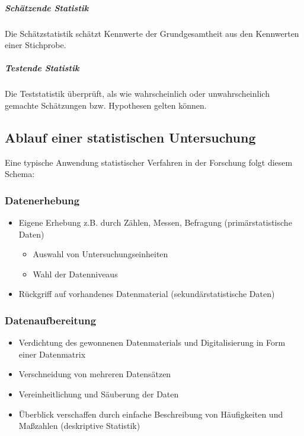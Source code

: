 \documentclass[
  11pt,
  ngerman,
  a4paper,
]{report}
\providecommand{\tightlist}{%
  \setlength{\itemsep}{0pt}\setlength{\parskip}{0pt}}
\begin{document}
\hypertarget{schuxe4tzende-statistik}{%
\subparagraph{Schätzende Statistik}\label{schuxe4tzende-statistik}}

Die Schätzstatistik schätzt Kennwerte der Grundgesamtheit aus den Kennwerten einer Stichprobe.

\hypertarget{testende-statistik}{%
\subparagraph{Testende Statistik}\label{testende-statistik}}

Die Teststatistik überprüft, als wie wahrscheinlich oder unwahrscheinlich gemachte Schätzungen bzw. Hypothesen gelten können.

\hypertarget{ablauf-einer-statistischen-untersuchung}{%
\subsection{Ablauf einer statistischen Untersuchung}\label{ablauf-einer-statistischen-untersuchung}}

Eine typische Anwendung statistischer Verfahren in der Forschung folgt diesem Schema:

\hypertarget{datenerhebung}{%
\subsubsection{Datenerhebung}\label{datenerhebung}}

\begin{itemize}
\tightlist
\item
  Eigene Erhebung z.B. durch Zählen, Messen, Befragung (primärstatistische Daten)

  \begin{itemize}
  \tightlist
  \item
    Auswahl von Untersuchungseinheiten
  \item
    Wahl der Datenniveaus
  \end{itemize}
\item
  Rückgriff auf vorhandenes Datenmaterial (sekundärstatistische Daten)
\end{itemize}

\hypertarget{datenaufbereitung}{%
\subsubsection{Datenaufbereitung}\label{datenaufbereitung}}

\begin{itemize}
\tightlist
\item
  Verdichtung des gewonnenen Datenmaterials und Digitalisierung in Form einer Datenmatrix
\item
  Verschneidung von mehreren Datensätzen
\item
  Vereinheitlichung und Säuberung der Daten
\item
  Überblick verschaffen durch einfache Beschreibung von Häufigkeiten und Maßzahlen (deskriptive Statistik)
\end{itemize}
\end{document}
